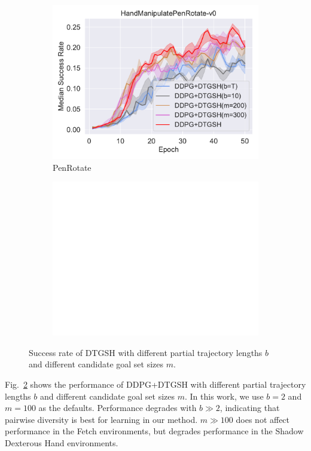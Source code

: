 \begin{figure}[t]
\begin{subfigure}[t]{0.33\textwidth}
    \includegraphics[width=\textwidth]{figures/chapter4/HandManipulatePenRotate-v0_ab2.pdf}
    \caption{PenRotate}
    \label{subfig:baseline_handpen_ab2}
  \end{subfigure}\hfill
  \begin{subfigure}[t]{0.33\textwidth}
    \includegraphics[width=\textwidth]{figures/chapter4/blank.png}
  \end{subfigure}\hfill
  \caption{Success rate of DTGSH with different partial trajectory lengths $b$ and different candidate goal set sizes $m$.} 
  \label{fig:ablation2}
\end{figure}

Fig.~\ref{fig:ablation2} shows the performance of DDPG+DTGSH with different partial trajectory lengths $b$ and different candidate goal set sizes $m$. In this work, we use $b = 2$ and $m = 100$ as the defaults. Performance degrades with $b \gg 2$, indicating that pairwise diversity is best for learning in our method. $m \gg 100$ does not affect performance in the Fetch environments, but degrades performance in the Shadow Dexterous Hand environments.


